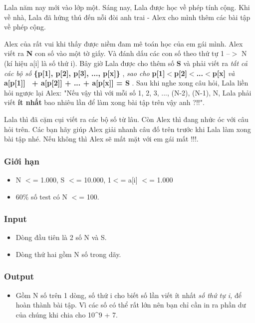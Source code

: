 



   Lala năm nay mới vào lớp một. Sáng nay, Lala được học về phép tính cộng. Khi về nhà, Lala đã hứng thú đến nỗi đòi anh trai - Alex cho mình thêm các bài tập về phép cộng.  

   Alex của rất vui khi thấy được niềm đam mê toán học của em gái mình. Alex viết ra   \textbf{    N   }   con số vào một tờ giấy. Và đánh dấu các con số theo thứ tự 1 --$>$ N (kí hiệu a[i] là số thứ i). Bây giờ Lala được cho thêm số   \textbf{    S   }   và phải viết ra   \emph{    tất cả các bộ số   }\textbf{    \{p[1], p[2], p[3], ..., p[x]\}   }   ,   \emph{    sao cho   }\textbf{\emph{}    p[1]$<$p[2]$<$...$<$p[x]   }\emph{    và   }\textbf{    a[p[1]]  + a[p[2]] + ... + a[p[x]] = S   }   . Sau khi nghe xong câu hỏi, Lala liền hỏi ngược lại Alex: "Nếu vậy thì với mỗi số 1, 2, 3, ..., (N-2), (N-1), N, Lala phải viết   \textbf{    ít nhất   }   bao nhiêu lần để làm xong bài tập trên vậy anh ?!!".  

   Lala thì đã cặm cụi viết ra các bộ số từ lâu. Còn Alex thì đang nhức óc với câu hỏi trên. Các bạn hãy giúp Alex giải nhanh câu đố trên trước khi Lala làm xong bài tập nhé. Nếu không thì Alex sẽ mất mặt với em gái mất !!!.  

\subsubsection{   Giới hạn  }
\begin{itemize}
	\item     N $<$= 1.000, S $<$= 10.000, 1$<$= a[i] $<$= 1.000   
	\item     60\% số test có N $<$= 100.   
\end{itemize}

\subsubsection{   Input  }
\begin{itemize}
	\item     Dòng đầu tiên là 2 số N và S.   
	\item     Dòng thứ hai gồm N số trong dãy.   
\end{itemize}

\subsubsection{   Output  }
\begin{itemize}
	\item     Gồm N số trên 1 dòng, số thứ i cho biết số lần viết    \emph{}    ít nhất    \emph{     số thứ tự i,    }    để hoàn thành bài tập. Vì các số có thể rất lớn nên bạn chỉ cần in ra phần dư của chúng khi chia cho 10\textasciicircum9 + 7.   
\end{itemize}

